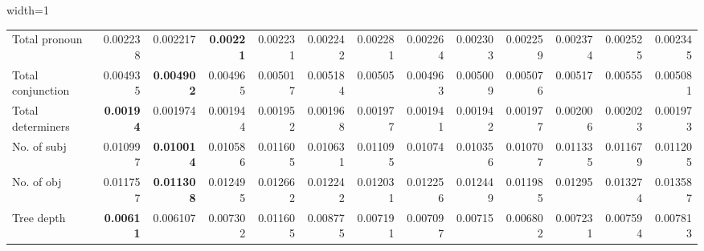 \documentclass[sigconf]{acmart}
\newcommand{\mj}{Mockingjay\xspace}
\begin{document}
\begin{table*}[]
\begin{adjustbox}{width=1\textwidth}
\begin{tabular}{@{}l|rrrrrrrrrrrr@{}}
Total pronoun                           & 0.002238          & 0.002217          & \textbf{0.00221} & 0.002231 & 0.002242 & 0.002281 & 0.002264 & 0.002303 & 0.002259 & 0.002374 & 0.002525 & 0.002345 \\
Total conjunction                       & 0.004935          & \textbf{0.004902} & 0.004965         & 0.005017 & 0.005184 & 0.00505  & 0.004963 & 0.005009 & 0.005076 & 0.00517  & 0.00555  & 0.005081 \\
Total determiners                       & \textbf{0.00194}  & 0.001974          & 0.001944         & 0.001952 & 0.001968 & 0.001977 & 0.001941 & 0.001942 & 0.001977 & 0.002006 & 0.002023 & 0.001973 \\
No. of subj                             & 0.010997          & \textbf{0.010014} & 0.010586         & 0.011605 & 0.010631 & 0.011095 & 0.01074  & 0.010356 & 0.010707 & 0.011335 & 0.011679 & 0.011205 \\
No. of obj                              & 0.011757          & \textbf{0.011308} & 0.012495         & 0.012662 & 0.012242 & 0.012031 & 0.012256 & 0.012449 & 0.011985 & 0.01295  & 0.013274 & 0.013587 \\
Tree depth                              & \textbf{0.00611}  & 0.006107          & 0.007302         & 0.011605 & 0.008775 & 0.007191 & 0.007097 & 0.00715  & 0.006802 & 0.007231 & 0.007594 & 0.007813\\
\bottomrule
\end{tabular}
\end{adjustbox}
\vspace{1 mm}
\caption{\label{Vocab_M} \small  Results (MSE) for text features on {\mj} for native read speech corpus (Librispeech)}
\end{table*}
\end{document}
